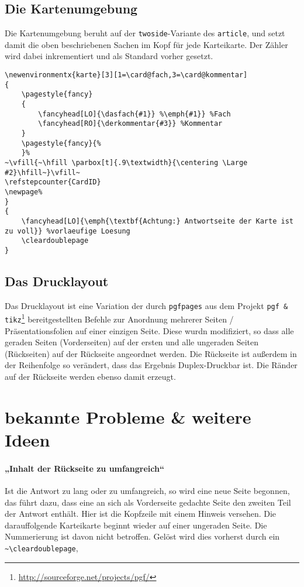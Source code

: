 \documentclass[a4paper]{article}
\begin{document}
\subsection{Die Kartenumgebung}
Die Kartenumgebung beruht auf der \lstinline!twoside!-Variante des \lstinline!article!, und setzt damit die oben beschriebenen Sachen im Kopf für jede Karteikarte. Der Zähler wird dabei inkrementiert und als Standard vorher gesetzt.
\begin{lstlisting}[title=Die Kartenumgebung]
\newenvironmentx{karte}[3][1=\card@fach,3=\card@kommentar]
{
	\pagestyle{fancy}
	{
		\fancyhead[LO]{\dasfach{#1}} %\emph{#1}} %Fach
		\fancyhead[RO]{\derkommentar{#3}} %Kommentar
	}
	\pagestyle{fancy}{% 
	}%
~\vfill{~\hfill \parbox[t]{.9\textwidth}{\centering \Large #2}\hfill~}\vfill~
\refstepcounter{CardID}
\newpage%
}
{
	\fancyhead[LO]{\emph{\textbf{Achtung:} Antwortseite der Karte ist zu voll}} %vorlaeufige Loesung
	\cleardoublepage
}
\end{lstlisting}
\subsection{Das Drucklayout}
Das Drucklayout ist eine Variation der durch \lstinline!pgfpages! aus dem Projekt \lstinline!pgf & tikz!\footnote{\url{http://sourceforge.net/projects/pgf/}} bereitgestellten Befehle zur Anordnung mehrerer Seiten / Präsentationsfolien auf einer einzigen Seite. Diese wurdn modifiziert, so dass alle geraden Seiten (Vorderseiten) auf der ersten und alle ungeraden Seiten (Rückseiten) auf der Rückseite angeordnet werden. Die Rückseite ist außerdem in der Reihenfolge so verändert, dass das Ergebnis Duplex-Druckbar ist. Die Ränder auf der Rückseite werden ebenso damit erzeugt. 
%
%
%
\section{bekannte Probleme \& weitere Ideen}
\paragraph{„Inhalt der Rückseite zu umfangreich“} %
Ist die Antwort zu lang oder zu umfangreich, so wird eine neue Seite begonnen, das führt dazu, dass eine an sich als Vorderseite gedachte Seite den zweiten Teil der Antwort enthält. Hier ist die Kopfzeile mit einem Hinweis versehen. Die darauffolgende Karteikarte beginnt wieder auf einer ungeraden Seite. Die Nummerierung ist davon nicht betroffen. Gelöst wird dies vorherst durch ein \lstinline!~\cleardoublepage!, 
\end{document}
